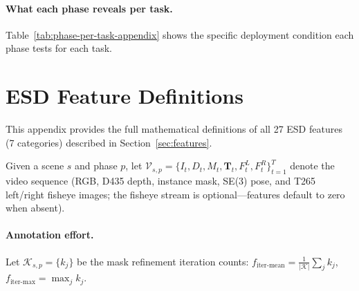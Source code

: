 \paragraph{What each phase reveals per task.}
Table~\ref{tab:phase-per-task-appendix} shows the specific deployment condition each phase tests for each task.

\begin{table}[h]
\centering
\small
\caption{What each phase tests for each task.}
\label{tab:phase-per-task-appendix}
\end{table}


\section{ESD Feature Definitions}
\label{sec:appendix-esd-full}

This appendix provides the full mathematical definitions of all 27 ESD features (7 categories) described in Section~\ref{sec:features}.

Given a scene $s$ and phase $p$, let $\mathcal{V}_{s,p} = \{I_t, D_t, M_t, \mathbf{T}_t, F^L_t, F^R_t\}_{t=1}^{T}$ denote the video sequence (RGB, D435 depth, instance mask, SE(3) pose, and T265 left/right fisheye images; the fisheye stream is optional---features default to zero when absent).

\paragraph{Annotation effort.}
Let $\mathcal{K}_{s,p} = \{k_j\}$ be the mask refinement iteration counts:
$f_{\text{iter-mean}} = \frac{1}{|\mathcal{K}|} \sum_j k_j$, \quad $f_{\text{iter-max}} = \max_j k_j$.

